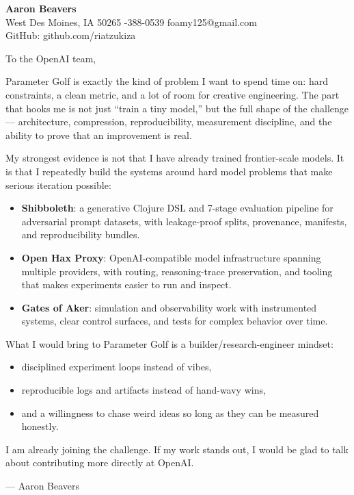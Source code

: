 \documentclass[10pt]{article}
\begin{document}
{\LARGE \textbf{Aaron Beavers}}\\
West Des Moines, IA 50265 \;\;\textbar\;-388-0539 \;\;\textbar\;\; foamy125@gmail.com\\
GitHub: github.com/riatzukiza

\vspace{10pt}
To the OpenAI team,

Parameter Golf is exactly the kind of problem I want to spend time on: hard constraints, a clean metric, and a lot of room for creative engineering. The part that hooks me is not just ``train a tiny model,'' but the full shape of the challenge --- architecture, compression, reproducibility, measurement discipline, and the ability to prove that an improvement is real.

My strongest evidence is not that I have already trained frontier-scale models. It is that I repeatedly build the systems around hard model problems that make serious iteration possible:
\begin{itemize}
  \item \textbf{Shibboleth}: a generative Clojure DSL and 7-stage evaluation pipeline for adversarial prompt datasets, with leakage-proof splits, provenance, manifests, and reproducibility bundles.
  \item \textbf{Open Hax Proxy}: OpenAI-compatible model infrastructure spanning multiple providers, with routing, reasoning-trace preservation, and tooling that makes experiments easier to run and inspect.
  \item \textbf{Gates of Aker}: simulation and observability work with instrumented systems, clear control surfaces, and tests for complex behavior over time.
\end{itemize}

What I would bring to Parameter Golf is a builder/research-engineer mindset:
\begin{itemize}
  \item disciplined experiment loops instead of vibes,
  \item reproducible logs and artifacts instead of hand-wavy wins,
  \item and a willingness to chase weird ideas so long as they can be measured honestly.
\end{itemize}

I am already joining the challenge. If my work stands out, I would be glad to talk about contributing more directly at OpenAI.

--- Aaron Beavers
\end{document}
